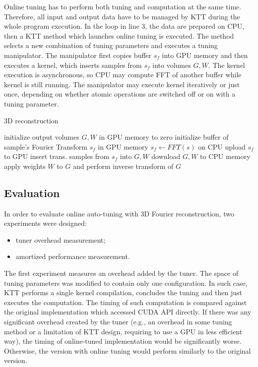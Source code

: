 \documentclass
[
    digital, %
    oneside, %
    table, %
    nolof, %
    nolot, %
    nocover %
]{fithesis3}
\begin{document}
Online tuning has to perform both tuning and computation at the same time. Therefore, all input and output data have to be managed by KTT during the whole program
execution. In the loop in line 3, the data are prepared on CPU, then a KTT method which launches online tuning is executed. The
method selects a new combination of tuning parameters and executes a tuning manipulator. The manipulator first copies buffer $s_f$ into GPU memory and then
executes a kernel, which inserts samples from $s_f$ into volumes $G, W$. The kernel execution is asynchronous, so CPU may compute FFT of another buffer while
kernel is still running. The manipulator may execute kernel iteratively or just once, depending on whether atomic operations are switched off or on with
a tuning parameter.

\begin{algorithm}
    \small
    \caption{3D reconstruction}
    \label{fourier_algorithm}
    \begin{algorithmic}[1]
        \State initialize output volumes $G, W$ in GPU memory to zero
        \State initialize buffer of sample's Fourier Transform $s_f$ in GPU memory
        \State $s_f \leftarrow FFT(s)$ on CPU
        \State upload $s_f$ to GPU
        \State insert trans. samples from $s_f$ into $G, W$
        \EndFor
        \State download $G, W$ to CPU memory
        \State apply weights $W$ to $G$ and perform inverse transform of $G$
    \end{algorithmic}
\end{algorithm}

\subsection{Evaluation}
In order to evaluate online auto-tuning with 3D Fourier reconstruction, two experiments were designed:
\begin{itemize}
    \item tuner overhead measurement;
    \item amortized performance measurement.
\end{itemize}
The first experiment measures an overhead added by the tuner. The space of tuning parameters was modified to contain only one configuration. In such case,
KTT performs a single kernel compilation, concludes the tuning and then just executes the computation. The timing of such computation is compared against
the original implementation which accessed CUDA API directly. If there was any significant overhead created by the tuner (e.g., an overhead in some tuning
method or a limitation of KTT design, requiring to use a GPU in less efficient way), the timing of online-tuned implementation would be significantly worse.
Otherwise, the version with online tuning would perform similarly to the original version.
\end{document}
